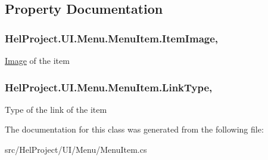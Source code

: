 \subsection{Property Documentation}
\hypertarget{class_hel_project_1_1_u_i_1_1_menu_1_1_menu_item_aa233e38588bdc0878b378d84faf08d01}{}
\subsubsection[{Item\+Image}]{ Hel\+Project.\+U\+I.\+Menu.\+Menu\+Item.\+Item\+Image\hspace{0.3cm}{\ttfamily [get]}, {\ttfamily [set]}}\label{class_hel_project_1_1_u_i_1_1_menu_1_1_menu_item_aa233e38588bdc0878b378d84faf08d01}


\hyperlink{class_hel_project_1_1_u_i_1_1_image}{Image} of the item 

\hypertarget{class_hel_project_1_1_u_i_1_1_menu_1_1_menu_item_a4973403225833802c1e4409b5eaf2be3}{}
\subsubsection[{Link\+Type}]{ Hel\+Project.\+U\+I.\+Menu.\+Menu\+Item.\+Link\+Type\hspace{0.3cm}{\ttfamily [get]}, {\ttfamily [set]}}\label{class_hel_project_1_1_u_i_1_1_menu_1_1_menu_item_a4973403225833802c1e4409b5eaf2be3}


Type of the link of the item 



The documentation for this class was generated from the following file\+:\begin{DoxyCompactItemize}
\item 
src/\+Hel\+Project/\+U\+I/\+Menu/Menu\+Item.\+cs\end{DoxyCompactItemize}

